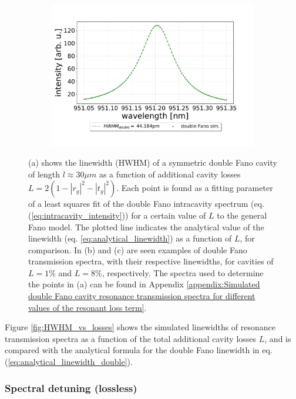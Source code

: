 \begin{figure}[h!]
\begin{subfigure}[c]{0.49\textwidth}
        \includegraphics[width=\textwidth]{figures/double_8percent_loss_30um.pdf}
        \caption{}
        \label{fig:lossy_spectrum_3.2percent}
    \end{subfigure}
    \caption{(a) shows the linewidth (HWHM) of a symmetric double Fano cavity of length $l \approx 30 \mu m$  as a function of additional cavity losses $L = 2(1 - |r_g|^2 - |t_g|^2)$. Each point is found as a fitting parameter of a least squares fit of the double Fano intracavity spectrum (eq. (\ref{eq:intracavity_intensity})) for a certain value of $L$ to the general Fano model. The plotted line indicates the analytical value of the linewidth (eq. \ref{eq:analytical_linewidth}) as a function of $L$, for comparison. In (b) and (c) are seen examples of double Fano transmission spectra, with their respective linewidths, for cavities of $L=1\%$ and $L=8\%$, respectively. The spectra used to determine the points in (a) can be found in Appendix \ref{appendix:Simulated double Fano cavity resonance transmission spectra for different values of the resonant loss term}.}
    \label{fig:HWHM_vs_losses_whole_figure}
\end{figure}

Figure \ref{fig:HWHM_vs_losses} shows the simulated linewidths of resonance transmission spectra as a function of the total additional cavity losses $L$, and is compared with the analytical formula for the double Fano linewidth in eq. (\ref{eq:analytical_linewidth_double}).

\subsubsection{Spectral detuning (lossless)} \label{sec:spectral_detuning}


